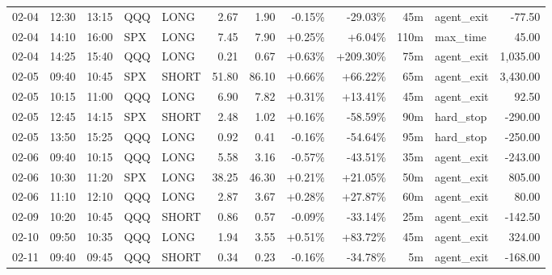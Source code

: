 \documentclass[11pt,a4paper,twoside]{article}
\begin{document}
\begin{center}
\begin{longtable}{>{\color{txtmain}}l l l l l r r r r r >{\color{txtmain}}l r}
02-04 & 12:30 & 13:15 & QQQ & LONG & 2.67 & 1.90 & \textcolor{lossred}{-0.15\%} & \textcolor{lossred}{-29.03\%} & 45m & agent\_exit & \textcolor{lossred}{-77.50} \\
02-04 & 14:10 & 16:00 & SPX & LONG & 7.45 & 7.90 & \textcolor{wingreen}{+0.25\%} & \textcolor{wingreen}{+6.04\%} & 110m & max\_time & \textcolor{wingreen}{45.00} \\
02-04 & 14:25 & 15:40 & QQQ & LONG & 0.21 & 0.67 & \textcolor{wingreen}{+0.63\%} & \textcolor{wingreen}{+209.30\%} & 75m & agent\_exit & \textcolor{wingreen}{1,035.00} \\
02-05 & 09:40 & 10:45 & SPX & SHORT & 51.80 & 86.10 & \textcolor{wingreen}{+0.66\%} & \textcolor{wingreen}{+66.22\%} & 65m & agent\_exit & \textcolor{wingreen}{3,430.00} \\
02-05 & 10:15 & 11:00 & QQQ & LONG & 6.90 & 7.82 & \textcolor{wingreen}{+0.31\%} & \textcolor{wingreen}{+13.41\%} & 45m & agent\_exit & \textcolor{wingreen}{92.50} \\
02-05 & 12:45 & 14:15 & SPX & SHORT & 2.48 & 1.02 & \textcolor{wingreen}{+0.16\%} & \textcolor{lossred}{-58.59\%} & 90m & hard\_stop & \textcolor{lossred}{-290.00} \\
02-05 & 13:50 & 15:25 & QQQ & LONG & 0.92 & 0.41 & \textcolor{lossred}{-0.16\%} & \textcolor{lossred}{-54.64\%} & 95m & hard\_stop & \textcolor{lossred}{-250.00} \\
02-06 & 09:40 & 10:15 & QQQ & LONG & 5.58 & 3.16 & \textcolor{lossred}{-0.57\%} & \textcolor{lossred}{-43.51\%} & 35m & agent\_exit & \textcolor{lossred}{-243.00} \\
02-06 & 10:30 & 11:20 & SPX & LONG & 38.25 & 46.30 & \textcolor{wingreen}{+0.21\%} & \textcolor{wingreen}{+21.05\%} & 50m & agent\_exit & \textcolor{wingreen}{805.00} \\
02-06 & 11:10 & 12:10 & QQQ & LONG & 2.87 & 3.67 & \textcolor{wingreen}{+0.28\%} & \textcolor{wingreen}{+27.87\%} & 60m & agent\_exit & \textcolor{wingreen}{80.00} \\
02-09 & 10:20 & 10:45 & QQQ & SHORT & 0.86 & 0.57 & \textcolor{lossred}{-0.09\%} & \textcolor{lossred}{-33.14\%} & 25m & agent\_exit & \textcolor{lossred}{-142.50} \\
02-10 & 09:50 & 10:35 & QQQ & LONG & 1.94 & 3.55 & \textcolor{wingreen}{+0.51\%} & \textcolor{wingreen}{+83.72\%} & 45m & agent\_exit & \textcolor{wingreen}{324.00} \\
02-11 & 09:40 & 09:45 & QQQ & SHORT & 0.34 & 0.23 & \textcolor{lossred}{-0.16\%} & \textcolor{lossred}{-34.78\%} & 5m & agent\_exit & \textcolor{lossred}{-168.00} \\

\end{longtable}
\end{center}
\end{document}
